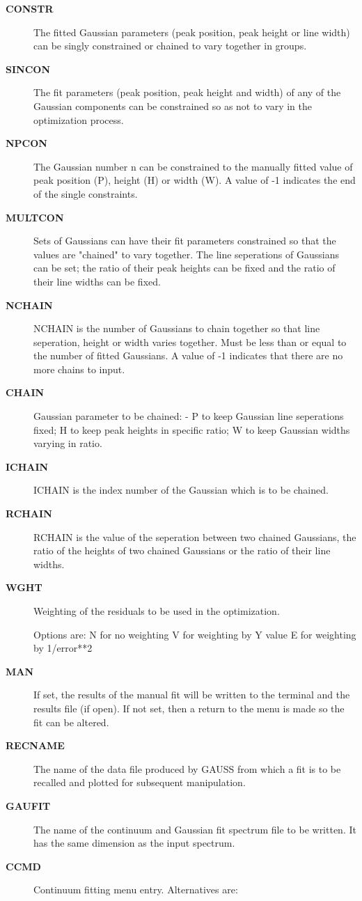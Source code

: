 \begin{description}
\begin{description}
\begin{description}
\item [\textbf{CONSTR}]
 The fitted Gaussian parameters (peak position, peak height or line
 width) can be singly constrained or chained to vary together in
 groups.
\item [\textbf{SINCON}]
 The fit parameters (peak position, peak height and width) of any of
 the Gaussian components can be constrained so as not to vary in the
 optimization process.
\item [\textbf{NPCON}]
 The Gaussian number n can be constrained to the manually fitted value
 of peak position (P), height (H) or width (W).  A value of -1
 indicates the end of the single constraints.
\item [\textbf{MULTCON}]
 Sets of Gaussians can have their fit parameters constrained so that
 the values are "chained" to vary together. The line seperations of
 Gaussians can be set; the ratio of their peak heights can be fixed
 and the ratio of their line widths can be fixed.
\item [\textbf{NCHAIN}]
 NCHAIN is the number of Gaussians to chain together so that line
 seperation, height or width varies together. Must be less than or
 equal to the number of fitted Gaussians. A value of -1 indicates that
 there are no more chains to input.
\item [\textbf{CHAIN}]
 Gaussian parameter to be chained: - P to keep Gaussian line
 seperations fixed; H to keep peak heights in specific ratio; W to
 keep Gaussian widths varying in ratio.
\item [\textbf{ICHAIN}]
 ICHAIN is the index number of the Gaussian which is to be chained.
\item [\textbf{RCHAIN}]
 RCHAIN is the value of the seperation between two chained Gaussians,
 the ratio of the heights of two chained Gaussians or the ratio of
 their line widths.
\item [\textbf{WGHT}]
 Weighting of the residuals to be used in the optimization.

 Options are: N for no weighting
              V for weighting by Y value
              E for weighting by 1/error**2
\item [\textbf{MAN}]
 If set, the results of the manual fit will be written to the
 terminal and the results file (if open).  If not set, then a
 return to the menu is made so the fit can be altered.
\item [\textbf{RECNAME}]
 The name of the data file produced by GAUSS from which a
 fit is to be recalled and plotted for subsequent manipulation.
\item [\textbf{GAUFIT}]
 The name of the continuum and Gaussian fit spectrum file to
 be written. It has the same dimension as the input spectrum.
\item [\textbf{CCMD}]
 Continuum fitting menu entry. Alternatives are:


\end{description}
\end{description}
\end{description}
